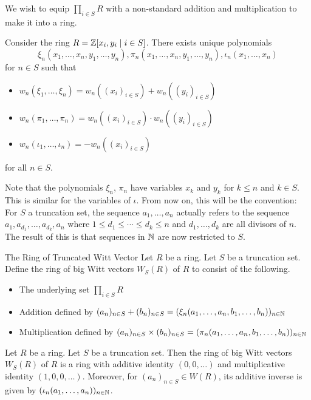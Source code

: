 \documentclass[a4paper]{article}
\begin{document}
We wish to equip $\prod_{i\in S}R$ with a non-standard addition and multiplication to make it into a ring. 

\begin{prp}{}{} Consider the ring $R=\mathbb{Z}[x_i,y_i\;|\;i\in S]$. There exists unique polynomials $$\xi_n(x_1,\dots,x_n,y_1,\dots,y_n), \pi_n(x_1,\dots,x_n,y_1,\dots,y_n),\iota_n(x_1,\dots,x_n)$$ for $n\in S$ such that 
\begin{itemize}
\item $w_n(\xi_1,\dots,\xi_n)=w_n((x_i)_{i\in S})+w_n((y_i)_{i\in S})$
\item $w_n(\pi_1,\dots,\pi_n)=w_n((x_i)_{i\in S})\cdot w_n((y_i)_{i\in S})$
\item $w_n(\iota_1,\dots,\iota_n)=-w_n((x_i)_{i\in S})$
\end{itemize}
for all $n\in S$. 
\end{prp}

Note that the polynomials $\xi_n$, $\pi_n$ have variables $x_k$ and $y_k$ for $k\leq n$ and $k\in S$. This is similar for the variables of $\iota$. From now on, this will be the convention: For $S$ a truncation set, the sequence $a_1,\dots,a_n$ actually refers to the sequence $a_1,a_{d_1},\dots,a_{d_k},a_n$ where $1\leq d_1\leq\cdots\leq d_k\leq n$ and $d_1,\dots,d_k$ are all divisors of $n$. The result of this is that sequences in $\mathbb{N}$ are now restricted to $S$. 

\begin{defn}{The Ring of Truncated Witt Vector}{} Let $R$ be a ring. Let $S$ be a truncation set. Define the ring of big Witt vectors $W_S(R)$ of $R$ to consist of the following. 
\begin{itemize}
\item The underlying set $\prod_{i\in S}R$
\item Addition defined by $(a_n)_{n\in S}+(b_n)_{n\in S}=(\xi_n(a_1,\dots,a_n,b_1,\dots,b_n))_{n\in\mathbb{N}}$
\item Multiplication defined by $(a_n)_{n\in S}\times(b_n)_{n\in S}=(\pi_n(a_1,\dots,a_n,b_1,\dots,b_n))_{n\in\mathbb{N}}$
\end{itemize}
\end{defn}

\begin{thm}{}{} Let $R$ be a ring. Let $S$ be a truncation set. Then the ring of big Witt vectors $W_S(R)$ of $R$ is a ring with additive identity $(0,0,\dots)$ and multiplicative identity $(1,0,0,\dots)$. Moreover, for $(a_n)_{n\in S}\in W(R)$, its additive inverse is given by $(\iota_n(a_1,\dots,a_n))_{n\in\mathbb{N}}$.
\end{thm}
\end{document}
